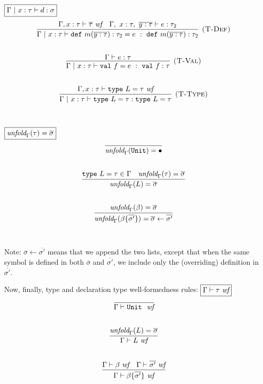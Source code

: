 \documentclass{article}
\newcommand{\keywadj}[1]{\mathtt{#1}}
\newcommand{\keyw}[1]{\keywadj{#1}~}
\begin{document}
$\fbox{$\Gamma ~|~ x:\tau \vdash d : \sigma$}$
\[
\begin{array}{c}
\infer[\textsc{(T-Def)}]
  {\Gamma  ~|~ x:\tau \vdash \keyw{def} m(\overline{y : \tau}) : \tau_2 = e~:~\keyw{def} m(\overline{y : \tau}) : \tau_2}
  {\Gamma, x:\tau \vdash \overline{\tau}~\textit{wf} & \Gamma,~x:\tau,~\overline{y : \tau} \vdash e : \tau_2}\\[5ex]

\infer[\textsc{(T-Val)}]
  {\Gamma ~|~ x:\tau \vdash \keyw{val} f = e~:~\keyw{val} f : \tau}
  {\Gamma \vdash e : \tau}\\[5ex]

\infer[\textsc{(T-Type)}]
  {\Gamma ~|~ x:\tau \vdash \keyw{type} L = \tau : \keyw{type} L = \tau}
  {\Gamma, x:\tau \vdash \keyw{type} L = \tau~\textit{wf}}\\[5ex]

\end{array}
\]

$\fbox{$\textit{unfold}_\Gamma(\tau) = \overline{\sigma}$}$
\[
\begin{array}{c}

\infer
  {\textit{unfold}_\Gamma(\keywadj{Unit}) = \bullet}
  {}\\[5ex]
  
\infer
  {\textit{unfold}_\Gamma(L) = \overline{\sigma}}
  {\keyw{type} L = \tau \in \Gamma & \textit{unfold}_\Gamma(\tau) = \overline{\sigma}}\\[5ex]
  
\infer
  {\textit{unfold}_\Gamma(\beta \{\overline{\sigma'}\}) = \overline{\sigma} \leftarrow \overline{\sigma'}}
  {\textit{unfold}_\Gamma(\beta) = \overline{\sigma}}\\[5ex]
  
\end{array}
\]

Note: $\overline{\sigma} \leftarrow \overline{\sigma'}$ means that we append the two lists, except that when the same symbol is defined in both $\overline{\sigma}$ and $\overline{\sigma'}$, we include only the (overriding) definition in $\overline{\sigma'}$.

Now, finally, type and declaration type well-formedness rules:
$\fbox{$\Gamma \vdash \tau~\textit{wf}$}$
\[
\begin{array}{c}
\infer
  {\Gamma \vdash \keyw{Unit}~\textit{wf}}
  {}\\[5ex]

\infer
  {\Gamma \vdash L~\textit{wf}}
  {\textit{unfold}_\Gamma(L) = \overline{\sigma}}\\[5ex]

\infer
  {\Gamma \vdash \beta \{\overline{\sigma'}\}~\textit{wf}}
  {\Gamma \vdash \beta ~\textit{wf} & \Gamma \vdash \overline{\sigma'}~\textit{wf}}\\[5ex]

\end{array}
\]
\end{document}
